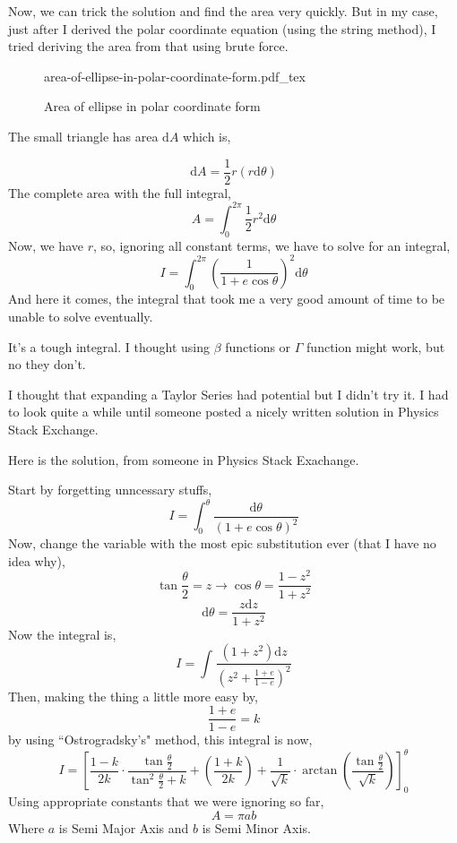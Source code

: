 \documentclass[11pt,a4paper]{article}
\newcommand{\incfig}[1]{%
    \def\svgwidth{0.7\columnwidth}
    {#1.pdf_tex}
}
\begin{document}
Now, we can trick the solution and find the area very quickly. But in my case, just after I derived the polar coordinate equation (using the string method), I tried deriving the area from that using brute force. 

\begin{figure}[ht!]
    \centering
    \incfig{area-of-ellipse-in-polar-coordinate-form}
    \caption{Area of ellipse in polar coordinate form}
    \label{fig:area-of-ellipse-in-polar-coordinate-form}
\end{figure}

The small triangle has area $\mathrm{d} A$ which is,

\[ 
    \mathrm{d} A = \frac{1}{2} r \left( r \mathrm{d} \theta \right) 
\]
The complete area with the full integral,
\[ 
A=\int_{0}^{2 \pi} \frac{1}{2} r^2 \mathrm{d} \theta 
\]
Now, we have $r$, so, ignoring all constant terms, we have to solve for an integral,
\[ 
    I = \int_{0 }^{2\pi} \left( \frac{1}{1 + e \cos \theta} \right) ^2 \mathrm{d} \theta 
\]
And here it comes, the integral that took me a very good amount of time to be unable to solve eventually. 

It's a tough integral. I thought using $\beta$ functions or $\Gamma$ function might work, but no they don't.

I thought that expanding a Taylor Series had potential but I didn't try it. I had to look quite a while until someone posted a nicely written solution in Physics Stack Exchange. 

Here is the solution, from someone in Physics Stack Exachange.

Start by forgetting unncessary stuffs,
\[ 
    I = \int_{0}^{\theta} \frac{\mathrm{d} \theta}{(1 + e \cos \theta)^2} 
\]
Now, change the variable with the most epic substitution ever (that I have no idea why),
\[ 
\tan \frac{\theta}{2} = z \to \cos \theta = \frac{1 - z^2}{1 + z^2}
\]
\[ 
\mathrm{d} \theta = \frac{z \mathrm{d} z}{1 + z^2}
\]
Now the integral is,
\[ 
    I = \int_{ }^{} \frac{\left( 1  + z^2 \right) \mathrm{d} z}{\left(z^2 + 
    \frac{1 + e}{1-e} \right)^2
    }  
\]
Then, making the thing a little more easy by,
\[ 
\frac{1+e}{1-e} = k
\]
by using ``Ostrogradsky's" method, this integral is now,
\[ 
I = \left[
    \frac{1-k}{2k} \cdot \frac{\tan \frac{\theta}{2}}{\tan ^2 \frac{\theta}{2} + k} +
    \left( \frac{1+k}{2k} \right) + \frac{1}{\sqrt{k} }\cdot \arctan \left(  \frac{\tan \frac{\theta}{2}}{\sqrt{k} }  \right)  
\right]_{ 0 }^{ \theta }
\]
Using appropriate constants that we were ignoring so far, 
\[ 
    \boxed{  A = \pi a b}
\]
Where $a$ is Semi Major Axis and $b$ is Semi Minor Axis.
\end{document}
